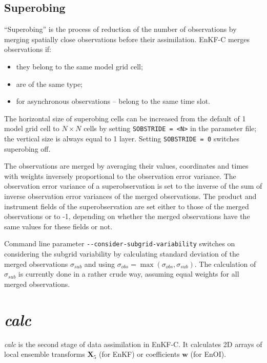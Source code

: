 \documentclass[11pt]{report}
\newcommand{\mb} {\mathbf}
\begin{document}
\subsection{Superobing}

``Superobing'' is the process of reduction of the number of observations by merging spatially close observations before their assimilation.
EnKF-C merges observations if:
\begin{itemize}
\item they belong to the same model grid cell;
\item are of the same type;
\item for asynchronous observations -- belong to the same time slot.
\end{itemize}
The horizontal size of superobing cells can be increased from the default of 1 model grid cell to $N \times N$ cells by setting \verb|SOBSTRIDE = <N>| in the parameter file; the vertical size is always equal to 1 layer.
Setting \verb|SOBSTRIDE = 0| switches superobing off.

The observations are merged by averaging their values, coordinates and times with weights inversely proportional to the observation error variance.
The observation error variance of a superobservation is set to the inverse of the sum of inverse observation error variances of the merged observations.
The product and instrument fields of the superobservation are set either to those of the merged observations or to -1, depending on whether the merged observations have the same values for these fields or not.

Command line parameter \verb|--consider-subgrid-variability| switches on considering the subgrid variability by calculating standard deviation of the merged observations $\sigma\!_{sub}$ and using $\sigma\!_{obs} = \max(\sigma\!_{obs}, \sigma\!_{sub})$.
The calculation of $\sigma\!_{sub}$ is currently done in a rather crude way, assuming equal weights for all merged observations.

\section{\emph{calc}}

\emph{calc} is the second stage of data assimilation in EnKF-C.
It calculates 2D arrays of local ensemble transforms $\mb X_5$ (for EnKF) or coefficients $\mb w$ (for EnOI).
\end{document}
